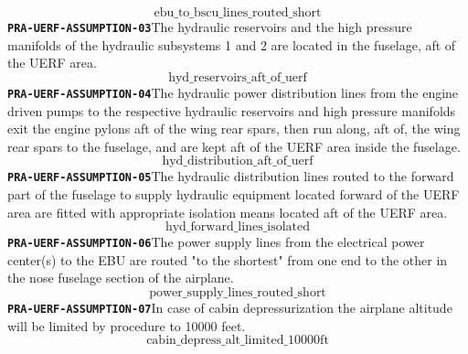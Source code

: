 \documentclass[11pt,a4paper]{article}
\begin{document}
\begin{dmath*}
\text{ebu\_to\_bscu\_lines\_routed\_short}
\end{dmath*}
\noindent\textbf{\texttt{PRA-UERF-ASSUMPTION-03}}\quad The hydraulic reservoirs and the high pressure manifolds of the hydraulic subsystems 1 and 2 are located in the fuselage, aft of the UERF area.
\begin{dmath*}
\text{hyd\_reservoirs\_aft\_of\_uerf}
\end{dmath*}
\noindent\textbf{\texttt{PRA-UERF-ASSUMPTION-04}}\quad The hydraulic power distribution lines from the engine driven pumps to the respective hydraulic reservoirs and high pressure manifolds exit the engine pylons aft of the wing rear spars, then run along, aft of, the wing rear spars to the fuselage, and are kept aft of the UERF area inside the fuselage.
\begin{dmath*}
\text{hyd\_distribution\_aft\_of\_uerf}
\end{dmath*}
\noindent\textbf{\texttt{PRA-UERF-ASSUMPTION-05}}\quad The hydraulic distribution lines routed to the forward part of the fuselage to supply hydraulic equipment located forward of the UERF area are fitted with appropriate isolation means located aft of the UERF area.
\begin{dmath*}
\text{hyd\_forward\_lines\_isolated}
\end{dmath*}
\noindent\textbf{\texttt{PRA-UERF-ASSUMPTION-06}}\quad The power supply lines from the electrical power center(s) to the EBU are routed "to the shortest" from one end to the other in the nose fuselage section of the airplane.
\begin{dmath*}
\text{power\_supply\_lines\_routed\_short}
\end{dmath*}
\noindent\textbf{\texttt{PRA-UERF-ASSUMPTION-07}}\quad In case of cabin depressurization the airplane altitude will be limited by procedure to 10000 feet.
\begin{dmath*}
\text{cabin\_depress\_alt\_limited\_10000ft}
\end{dmath*}
\end{document}
